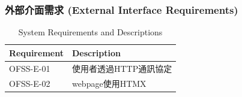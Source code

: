 \documentclass[a4paper, 12pt]{article}
\begin{document}
\subsubsection{外部介面需求 (External Interface Requirements)}
\begin{table}[h]
    \centering
    \renewcommand{\arraystretch}{1.35}
    \begin{tabular}{|p{3cm}|p{10cm}|}
        \hline
        \textbf{Requirement} & \textbf{Description} \\
        \hline
        OFSS-E-01 & 使用者透過HTTP通訊協定 \\
        \hline
        OFSS-E-02 & webpage使用HTMX \\
        \hline
    \end{tabular}
    \caption{System Requirements and Descriptions}
    \label{tab:system-requirements}
\end{table}
\newpage
\end{document}
